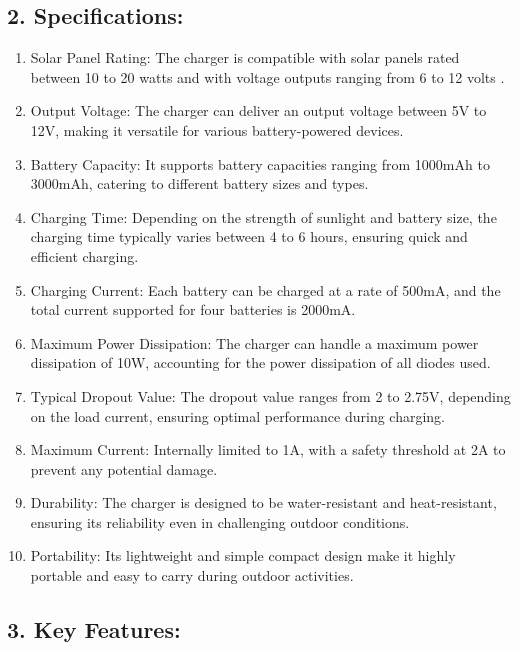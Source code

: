 \documentclass[twocolumn]{article}
\begin{document}
\subsection*{2. Specifications:}
\begin{enumerate}
    \item Solar Panel Rating: The charger is compatible with solar panels rated between 10 to 20 watts and with voltage outputs ranging from 6 to 12 volts
    .
    \item Output Voltage: The charger can deliver an output voltage between 5V to 12V, making it versatile for various battery-powered devices.

    \item Battery Capacity: It supports battery capacities ranging from 1000mAh to 3000mAh, catering to different battery sizes and types.

    \item Charging Time: Depending on the strength of sunlight and battery size, the charging time typically varies between 4 to 6 hours, ensuring quick and efficient charging.

    \item Charging Current: Each battery can be charged at a rate of 500mA, and the total current supported for four batteries is 2000mA.

    \item Maximum Power Dissipation: The charger can handle a maximum power dissipation of 10W, accounting for the power dissipation of all diodes used.

    \item Typical Dropout Value: The dropout value ranges from 2 to 2.75V, depending on the load current, ensuring optimal performance during charging.

    \item Maximum Current: Internally limited to 1A, with a safety threshold at 2A to prevent any potential damage.

    \item Durability: The charger is designed to be water-resistant and heat-resistant, ensuring its reliability even in challenging outdoor conditions.

    \item Portability: Its lightweight and simple compact design make it highly portable and easy to carry during outdoor activities.
    
\end{enumerate}


\subsection*{3. Key Features:}
\end{document}

